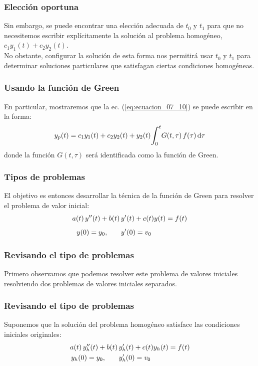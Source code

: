 \documentclass[12pt]{beamer}
\begin{document}
\begin{frame}
\frametitle{Elección oportuna}
Sin embargo, se puede encontrar una elección adecuada de $t_{0}$ y $t_{1}$ para que no necesitemos escribir explícitamente la solución al problema homogéneo, $c_{1} y_{1} (t) + c_{2} y_{2} (t)$. 
\\
\bigskip
\pause
No obstante, configurar la solución de esta forma nos permitirá usar $t_{0}$ y $t_{1}$ para determinar soluciones particulares que satisfagan ciertas condiciones homogéneas.
\end{frame}
\begin{frame}
\frametitle{Usando la función de Green}
En particular, mostraremos que la ec. (\ref{eq:ecuacion_07_10}) se puede escribir en la forma:
\pause
\begin{align}
y_{p} (t) = c_{1} y_{1} (t) + c_{2} y_{2} (t) +  y_{2} (t) \scaleint{6ex}_{\bs 0}^{t} G (t,\tau) \, f (\tau) \dd{\tau}
\label{eq:ecuacion_07_11}
\end{align}
donde la función $G (t, \tau)$ será identificada como la función de Green.
\end{frame}
\begin{frame}
\frametitle{Tipos de problemas}
El objetivo es entonces desarrollar la técnica de la función de Green para resolver el problema de valor inicial:
\pause
\begin{eqnarray}
\begin{aligned}
a (t) \, {y}^{\prime \prime} (t) + b (t) \, &{y}^{\prime} (t) + c (t) y(t) = f (t) \\[0.5em]
y (0) = y_{0}, \hspace{0.7cm} &{y}^{\prime} (0) = v_{0}
\end{aligned}
\label{eq:ecuacion_07_12}
\end{eqnarray}
\end{frame}
\begin{frame}
\frametitle{Revisando el tipo de problemas}
Primero observamos que podemos resolver este problema de valores iniciales resolviendo dos problemas de valores iniciales separados.
\end{frame}
\begin{frame}
\frametitle{Revisando el tipo de problemas}
Suponemos que la solución del problema homogéneo satisface las condiciones iniciales originales:
\pause
\begin{eqnarray}
\begin{aligned}
a (t) \, {y}^{\prime \prime}_{h} (t) + b (t) \, &{y}^{\prime}_{h} (t) + c (t) y_{h} (t) = f (t) \\
y_{h} (0) = y_{0}, \hspace{0.7cm} &{y}^{\prime}_{h} (0) = v_{0}
\end{aligned}
\label{eq:ecuacion_07_13}
\end{eqnarray}
\end{frame}
\end{document}
